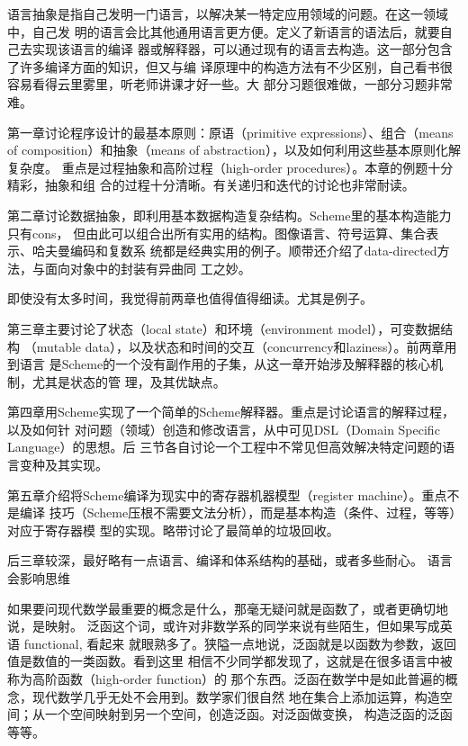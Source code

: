 \documentclass[11pt]{article}
\begin{document}
语言抽象是指自己发明一门语言，以解决某一特定应用领域的问题。在这一领域中，自己发
明的语言会比其他通用语言更方便。定义了新语言的语法后，就要自己去实现该语言的编译
器或解释器，可以通过现有的语言去构造。这一部分包含了许多编译方面的知识，但又与编
译原理中的构造方法有不少区别，自己看书很容易看得云里雾里，听老师讲课才好一些。大
部分习题很难做，一部分习题非常难。

第一章讨论程序设计的最基本原则：原语（primitive expressions）、组合（means of
composition）和抽象（means of abstraction），以及如何利用这些基本原则化解复杂度。
重点是过程抽象和高阶过程（high-order procedures）。本章的例题十分精彩，抽象和组
合的过程十分清晰。有关递归和迭代的讨论也非常耐读。

第二章讨论数据抽象，即利用基本数据构造复杂结构。Scheme里的基本构造能力只有cons，
但由此可以组合出所有实用的结构。图像语言、符号运算、集合表示、哈夫曼编码和复数系
统都是经典实用的例子。顺带还介绍了data-directed方法，与面向对象中的封装有异曲同
工之妙。

即使没有太多时间，我觉得前两章也值得值得细读。尤其是例子。

第三章主要讨论了状态（local state）和环境（environment model），可变数据结构
（mutable data），以及状态和时间的交互（concurrency和laziness）。前两章用到语言
是Scheme的一个没有副作用的子集，从这一章开始涉及解释器的核心机制，尤其是状态的管
理，及其优缺点。

第四章用Scheme实现了一个简单的Scheme解释器。重点是讨论语言的解释过程，以及如何针
对问题（领域）创造和修改语言，从中可见DSL（Domain Specific Language）的思想。后
三节各自讨论一个工程中不常见但高效解决特定问题的语言变种及其实现。

第五章介绍将Scheme编译为现实中的寄存器机器模型（register machine）。重点不是编译
技巧（Scheme压根不需要文法分析），而是基本构造（条件、过程，等等）对应于寄存器模
型的实现。略带讨论了最简单的垃圾回收。

后三章较深，最好略有一点语言、编译和体系结构的基础，或者多些耐心。 语言会影响思维

如果要问现代数学最重要的概念是什么，那毫无疑问就是函数了，或者更确切地说，是映射。
泛函这个词，或许对非数学系的同学来说有些陌生，但如果写成英语 functional, 看起来
就眼熟多了。狭隘一点地说，泛函就是以函数为参数，返回值是数值的一类函数。看到这里
相信不少同学都发现了，这就是在很多语言中被称为高阶函数（high-order function）的
那个东西。泛函在数学中是如此普遍的概念，现代数学几乎无处不会用到。数学家们很自然
地在集合上添加运算，构造空间；从一个空间映射到另一个空间，创造泛函。对泛函做变换，
构造泛函的泛函等等。
\end{document}
